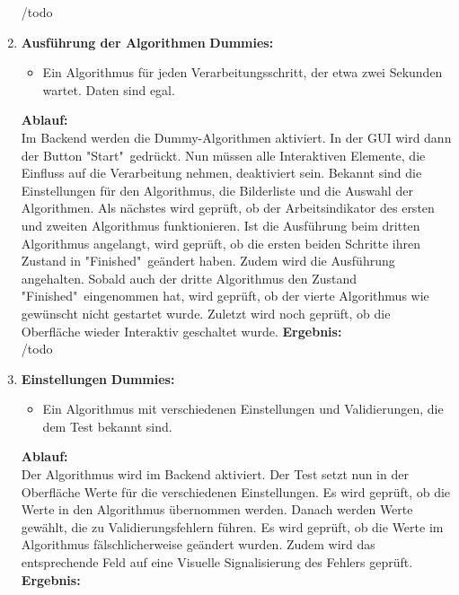 \begin{enumerate}[align=left, leftmargin=4em, label={\textbf{\textbackslash T3.\arabic*\textbackslash}} ]
	/todo
	\\\item \textbf{Ausführung der Algorithmen}
	\subitem \textbf{Dummies:}\begin{itemize}
		\item Ein Algorithmus für jeden Verarbeitungsschritt, der etwa zwei Sekunden wartet. Daten sind egal.
	\end{itemize}
	\subitem \textbf{Ablauf:}\\ Im Backend werden die Dummy-Algorithmen aktiviert. In der GUI wird dann der Button "{}Start" gedrückt. Nun müssen alle Interaktiven Elemente, die Einfluss auf die Verarbeitung nehmen, deaktiviert sein. Bekannt sind die Einstellungen für den Algorithmus, die Bilderliste und die Auswahl der Algorithmen. Als nächstes wird geprüft, ob der Arbeitsindikator des ersten und zweiten Algorithmus funktionieren. Ist die Ausführung beim dritten Algorithmus angelangt, wird geprüft, ob die ersten beiden Schritte ihren Zustand in "{}Finished" geändert haben. Zudem wird die Ausführung angehalten. Sobald auch der dritte Algorithmus den Zustand "{}Finished" eingenommen hat, wird geprüft, ob der vierte Algorithmus wie gewünscht nicht gestartet wurde. Zuletzt wird noch geprüft, ob die Oberfläche wieder Interaktiv geschaltet wurde.
	\subitem\textbf{Ergebnis:}\\
	/todo
	\\\item \textbf{Einstellungen}
	\subitem \textbf{Dummies:}\begin{itemize}
		\item Ein Algorithmus mit verschiedenen Einstellungen und Validierungen, die dem Test bekannt sind.
	\end{itemize}
	\subitem \textbf{Ablauf:}\\ Der Algorithmus wird im Backend aktiviert. Der Test setzt nun in der Oberfläche Werte für die verschiedenen Einstellungen. Es wird geprüft, ob die Werte in den Algorithmus übernommen werden. Danach werden Werte gewählt, die zu Validierungsfehlern führen. Es wird geprüft, ob die Werte im Algorithmus fälschlicherweise geändert wurden. Zudem wird das entsprechende Feld auf eine Visuelle Signalisierung des Fehlers geprüft.
	\subitem\textbf{Ergebnis:}\\
	
\end{enumerate}